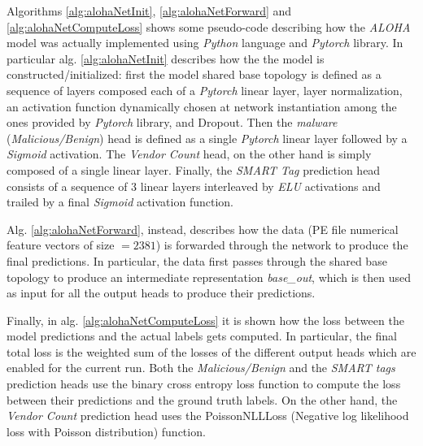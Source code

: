 \documentclass[pdfa%
,cucitura%
]{toptesi}
\begin{document}
Algorithms \ref{alg:alohaNetInit}, \ref{alg:alohaNetForward} and \ref{alg:alohaNetComputeLoss} shows some pseudo-code describing how the \textit{ALOHA} model was actually implemented using \textit{Python} language and \textit{Pytorch} library. In particular alg. \ref{alg:alohaNetInit} describes how the the model is constructed/initialized: first the model shared base topology is defined as a sequence of layers composed each of a \textit{Pytorch} linear layer, layer normalization, an activation function dynamically chosen at network instantiation among the ones provided by \textit{Pytorch} library, and Dropout. Then the \textit{malware} (\textit{Malicious/Benign}) head is defined as a single \textit{Pytorch} linear layer followed by a \textit{Sigmoid} activation. The \textit{Vendor Count} head, on the other hand is simply composed of a single linear layer. Finally, the \textit{SMART Tag} prediction head consists of a sequence of 3 linear layers interleaved by \textit{ELU} activations and trailed by a final \textit{Sigmoid} activation function.

Alg. \ref{alg:alohaNetForward}, instead, describes how the data (PE file numerical feature vectors of size $=2381$) is forwarded through the network to produce the final predictions. In particular, the data first passes through the shared base topology to produce an intermediate representation \textit{base\_out}, which is then used as input for all the output heads to produce their predictions.

Finally, in alg. \ref{alg:alohaNetComputeLoss} it is shown how the loss between the model predictions and the actual labels gets computed. In particular, the final total loss is the weighted sum of the losses of the different output heads which are enabled for the current run. Both the \textit{Malicious/Benign} and the \textit{SMART tags} prediction heads use the binary cross entropy loss function to compute the loss between their predictions and the ground truth labels. On the other hand, the \textit{Vendor Count} prediction head uses the PoissonNLLLoss (Negative log likelihood loss with Poisson distribution) function.
\end{document}
